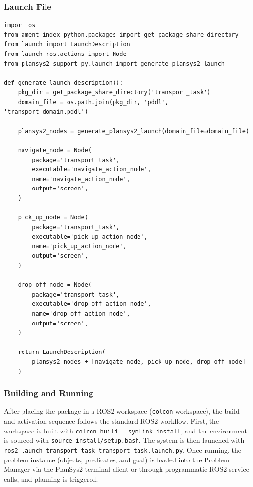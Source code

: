 \documentclass[12pt,a4paper]{article}
\theoremstyle{definition}
\theoremstyle{plain}
\begin{document}
\subsubsection{Launch File}

\begin{lstlisting}[language={}, caption={Python launch file that starts PlanSys2 core nodes,
loads the PDDL domain, and launches the three action executors
(\texttt{launch/transport\_task.launch.py}).}, label=lst:launch]
import os
from ament_index_python.packages import get_package_share_directory
from launch import LaunchDescription
from launch_ros.actions import Node
from plansys2_support_py.launch import generate_plansys2_launch

def generate_launch_description():
    pkg_dir = get_package_share_directory('transport_task')
    domain_file = os.path.join(pkg_dir, 'pddl', 'transport_domain.pddl')

    plansys2_nodes = generate_plansys2_launch(domain_file=domain_file)

    navigate_node = Node(
        package='transport_task',
        executable='navigate_action_node',
        name='navigate_action_node',
        output='screen',
    )

    pick_up_node = Node(
        package='transport_task',
        executable='pick_up_action_node',
        name='pick_up_action_node',
        output='screen',
    )

    drop_off_node = Node(
        package='transport_task',
        executable='drop_off_action_node',
        name='drop_off_action_node',
        output='screen',
    )

    return LaunchDescription(
        plansys2_nodes + [navigate_node, pick_up_node, drop_off_node]
    )
\end{lstlisting}

\subsubsection{Building and Running}

After placing the package in a ROS2 workspace (\texttt{colcon} workspace), the build and
activation sequence follows the standard ROS2 workflow. First, the workspace is built with
\texttt{colcon build -{}-symlink-install}, and the environment is sourced with
\texttt{source install/setup.bash}. The system is then launched with
\texttt{ros2 launch transport\_task transport\_task.launch.py}. Once running, the
problem instance (objects, predicates, and goal) is loaded into the Problem Manager via the
PlanSys2 terminal client or through programmatic ROS2 service calls, and planning is triggered.
\end{document}

